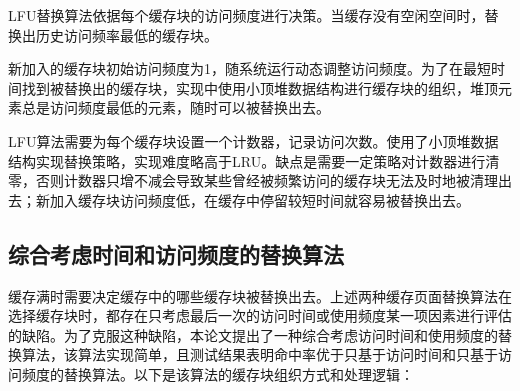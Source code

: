 LFU替换算法\cite{LFU}依据每个缓存块的访问频度进行决策。当缓存没有空闲空间时，替换出历史访问频率最低的缓存块。

新加入的缓存块初始访问频度为1，随系统运行动态调整访问频度。为了在最短时间找到被替换出的缓存块，实现中使用小顶堆数据结构进行缓存块的组织，堆顶元素总是访问频度最低的元素，随时可以被替换出去。

LFU算法需要为每个缓存块设置一个计数器，记录访问次数。使用了小顶堆数据结构实现替换策略，实现难度略高于LRU。缺点是需要一定策略对计数器进行清零，否则计数器只增不减会导致某些曾经被频繁访问的缓存块无法及时地被清理出去；新加入缓存块访问频度低，在缓存中停留较短时间就容易被替换出去。

\subsection{综合考虑时间和访问频度的替换算法}

缓存满时需要决定缓存中的哪些缓存块被替换出去。上述两种缓存页面替换算法在选择缓存块时，都存在只考虑最后一次的访问时间或使用频度某一项因素进行评估的缺陷。为了克服这种缺陷，本论文提出了一种综合考虑访问时间和使用频度的替换算法，该算法实现简单，且测试结果表明命中率优于只基于访问时间和只基于访问频度的替换算法。以下是该算法的缓存块组织方式和处理逻辑：

